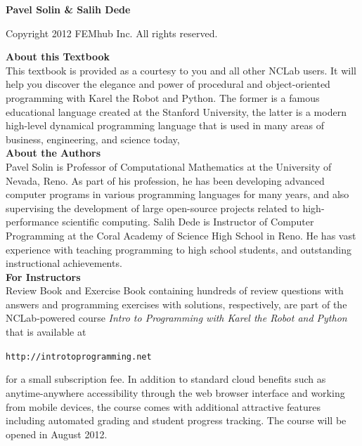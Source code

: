 \documentclass[article,A4,12pt]{llncs}
\newif\iffullversion
\begin{document}
\begin{center}
\iffullversion
\else
\centerline{\huge \color{red}{PREVIEW}}
\fi
\vfill
{\large
{\bf Pavel Solin \& Salih Dede}
}
\end{center}
\vfill
\vfill
\begin{center}
Copyright 2012 FEMhub Inc. All rights reserved.
\end{center}
\newpage
\vbox{}
\vfill
{
\noindent
{\bf About this Textbook}\\[4mm]
This textbook is provided as a courtesy to you and all other NCLab users. 
It will help you discover the elegance and power of procedural and 
object-oriented programming with Karel the Robot and Python. The former 
is a famous educational language created at the Stanford University, the 
latter is a modern high-level dynamical programming language that is used
in many areas of business, engineering, and science today, \\[12mm]

\noindent
{\bf About the Authors}\\[4mm]
Pavel Solin is Professor of Computational Mathematics at the University of Nevada, Reno. 
As part of his profession, he has been developing advanced computer programs in various 
programming languages for
many years, and also supervising the development of large open-source projects related to 
high-performance scientific computing. Salih Dede is Instructor of Computer
Programming at the Coral Academy of Science High School in Reno. He has vast experience 
with teaching programming to high school students, and outstanding instructional
achievements. \\[12mm]


\noindent
{\bf For Instructors}\\[4mm]
Review Book and Exercise Book containing 
hundreds of review questions with answers and programming exercises with
solutions, respectively, are part of the NCLab-powered course 
{\em Intro to Programming with Karel the Robot and Python} that is 
available at \\

\centerline{\tt http://introtoprogramming.net}
\vspace{5mm}

\noindent
for a small subscription fee.  In addition to 
standard cloud benefits such as anytime-anywhere accessibility through 
the web browser interface and working from mobile devices, the course comes with 
additional attractive features including 
automated grading and student progress tracking. 
The course will be opened in August 2012.
}
\vfill
\end{document}
